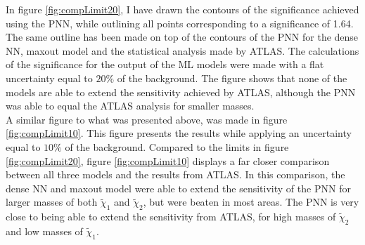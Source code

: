 In figure \ref{fig:compLimit20}, I have drawn the contours of the significance achieved using the \ac{PNN},
while outlining all points corresponding to a significance of 1.64. The same outline has been made on top of the 
contours of the \ac{PNN} for the dense \ac{NN}, maxout model and the statistical analysis made by ATLAS. The calculations
of the significance for the output of the \ac{ML} models were made with a flat uncertainty equal to $20\%$ of the background.
The figure shows that none of the models are able to extend the sensitivity achieved by ATLAS, although the \ac{PNN} was able to equal
the ATLAS analysis for smaller masses.
\\
A similar figure to what was presented above, was made in figure \ref{fig:compLimit10}. This figure presents the results while applying an
uncertainty equal to $10\%$ of the background. Compared to the limits in figure \ref{fig:compLimit20}, figure \ref{fig:compLimit10} displays 
a far closer comparison between all three models and the results from ATLAS. In this comparison, the dense \ac{NN} and maxout model were able 
to extend the sensitivity of the \ac{PNN} for larger masses of both $\tilde{\chi}_1$ and $\tilde{\chi}_2$, but were beaten in most areas. The 
\ac{PNN} is very close to being able to extend the sensitivity from ATLAS, for high masses of $\tilde{\chi}_2$ and low masses of $\tilde{\chi}_1$. 
